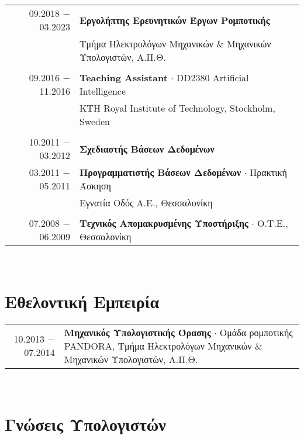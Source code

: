 \documentclass[a4paper,10pt,twoside]{article}
\begin{document}
\begin{tabular}{rp{12cm}}
09.2018 $-$ 03.2023 & \textbf{Εργολήπτης Ερευνητικών Έργων Ρομποτικής} \\
                    & Τμήμα Ηλεκτρολόγων Μηχανικών \& Μηχανικών Υπολογιστών, Α.Π.Θ.\\
&\\
09.2016 $-$ 11.2016 & \textbf{Teaching Assistant} $\cdot$ DD2380 Artificial Intelligence \\ & KTH Royal Institute of Technology, Stockholm, Sweden\\
&\\
10.2011 $-$ 03.2012 & \textbf{Σχεδιαστής Βάσεων Δεδομένων} \\
03.2011 $-$ 05.2011 & \textbf{Προγραμματιστής Βάσεων Δεδομένων} $\cdot$ Πρακτική Άσκηση \\ & Εγνατία Οδός Α.Ε., Θεσσαλονίκη \\
&\\
07.2008 $-$ 06.2009 & \textbf{Τεχνικός Απομακρυσμένης Υποστήριξης} $\cdot$ Ο.Τ.Ε., Θεσσαλονίκη\\
\end{tabular} \\



\section{Εθελοντική Εμπειρία}

\begin{tabular}{rp{12cm}}
10.2013 $-$ 07.2014 & \textbf{Μηχανικός Υπολογιστικής Όρασης} $\cdot$ Ομάδα ρομποτικής PANDORA, Τμήμα Ηλεκτρολόγων Μηχανικών \& Μηχανικών Υπολογιστών, Α.Π.Θ.\\
\end{tabular} \\


\section{Γνώσεις Υπολογιστών}
\end{document}
